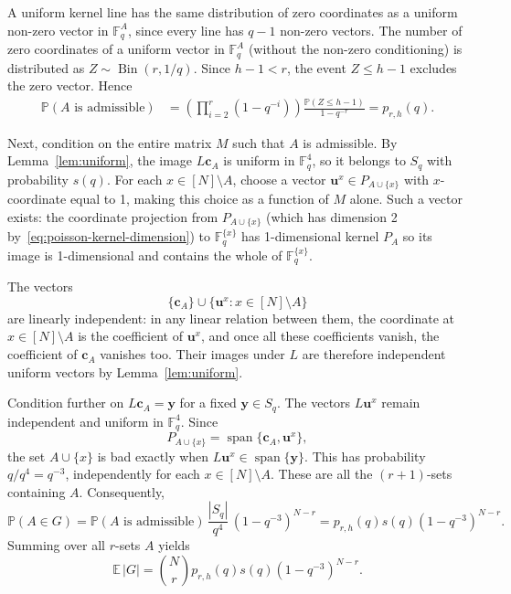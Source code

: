 \documentclass[10pt,a4paper]{article}
\numberwithin{equation}{section}
\theoremstyle{definition}
\theoremstyle{remark}
\newcommand{\V}[1]{\boldsymbol{#1}}
\begin{document}
A uniform kernel line has the same distribution of zero coordinates as a uniform non-zero vector in $\mathbb F_q^A$, since every line has $q-1$ non-zero vectors. The number of zero coordinates of a uniform vector in $\mathbb F_q^A$ (without the non-zero conditioning) is  distributed as $Z\sim\operatorname{Bin}(r,1/q)$. Since $h-1<r$, the event $Z\le h-1$ excludes the zero vector. Hence
\begin{align*}
	\mathbb P(A\text{ is admissible})
	&=\left(\prod_{i=2}^{r}(1-q^{-i})\right)
	\frac{\mathbb P(Z\le h-1)}{1-q^{-r}}
	=p_{r,h}(q).
	\label{eq:poisson-admissibility}
\end{align*}

Next, condition on the entire matrix $M$ such that $A$ is admissible. By Lemma~\ref{lem:uniform}, the image $L\V{c}_A$ is uniform in $\mathbb F_q^4$, so it belongs to $S_q$ with probability $s(q)$. For each $x\in[N]\setminus A$, choose a vector $\V{u}^x\in P_{A\cup\{x\}}$ with $x$-coordinate equal to 1, making this choice as a function of $M$ alone. Such a vector exists: the coordinate projection from  $P_{A\cup\{x\}}$ (which has dimension 2 by~\eqref{eq:poisson-kernel-dimension}) to $\mathbb F_q^{\{x\}}$ has 1-dimensional kernel $P_A$ so its image is 1-dimensional and contains the whole of $\mathbb F_q^{\{x\}}$.

The vectors
\[
\{\V{c}_A\}\cup\{\V{u}^x:x\in[N]\setminus A\}
\]
are linearly independent: in any linear relation between them, the coordinate at $x\in [N]\setminus A$ is the coefficient of $\V{u}^x$, and once all these coefficients vanish, the coefficient of $\V{c}_A$ vanishes too. Their images under $L$ are therefore independent uniform vectors by Lemma~\ref{lem:uniform}.

Condition further on $L\V{c}_A=\V{y}$ for a fixed $\V{y}\in S_q$. The vectors $L\V{u}^x$ remain independent and uniform in $\mathbb F_q^4$. Since
\[
P_{A\cup\{x\}}=\operatorname{span}\{\V{c}_A,\V{u}^x\},
\]
the set $A\cup\{x\}$ is bad exactly when $L\V{u}^x\in\operatorname{span}\{\V{y}\}$. This has probability $q/q^4=q^{-3}$, independently for each $x\in [N]\setminus A$. These are all the $(r+1)$-sets containing $A$. Consequently,
\begin{equation*}
	\mathbb P(A\in G)=\mathbb P(A\text{ is admissible})\, \frac{|S_q|}{q^4}\, (1-q^{-3})^{N-r}=p_{r,h}(q)s(q)(1-q^{-3})^{N-r}.
\end{equation*}
Summing over all $r$-sets $A$ yields
\begin{equation}\label{eq:poisson-expectation}
	\mathbb E\,|G|=\binom Nr p_{r,h}(q)s(q)(1-q^{-3})^{N-r}.
\end{equation}
\end{document}
